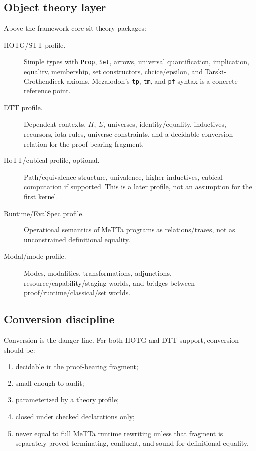 \documentclass[11pt]{article}
\newcommand{\MeTTa}{\textup{MeTTa}}
\newcommand{\HOTG}{\textup{HOTG}}
\newcommand{\DTT}{\textup{DTT}}
\newcommand{\code}[1]{\texttt{#1}}
\begin{document}
\subsection{Object theory layer}

Above the framework core sit theory packages:

\begin{description}
\item[HOTG/STT profile.] Simple types with \code{Prop}, \code{Set}, arrows, universal quantification, implication, equality, membership, set constructors, choice/epsilon, and Tarski-Grothendieck axioms.  Megalodon's \code{tp}, \code{tm}, and \code{pf} syntax is a concrete reference point.
\item[DTT profile.] Dependent contexts, \(\Pi\), \(\Sigma\), universes, identity/equality, inductives, recursors, iota rules, universe constraints, and a decidable conversion relation for the proof-bearing fragment.
\item[HoTT/cubical profile, optional.] Path/equivalence structure, univalence, higher inductives, cubical computation if supported.  This is a later profile, not an assumption for the first kernel.
\item[Runtime/EvalSpec profile.] Operational semantics of \MeTTa{} programs as relations/traces, not as unconstrained definitional equality.
\item[Modal/mode profile.] Modes, modalities, transformations, adjunctions, resource/capability/staging worlds, and bridges between proof/runtime/classical/set worlds.
\end{description}

\subsection{Conversion discipline}

Conversion is the danger line.  For both \HOTG{} and \DTT{} support, conversion should be:

\begin{enumerate}
\item decidable in the proof-bearing fragment;
\item small enough to audit;
\item parameterized by a theory profile;
\item closed under checked declarations only;
\item never equal to full \MeTTa{} runtime rewriting unless that fragment is separately proved terminating, confluent, and sound for definitional equality.
\end{enumerate}
\end{document}
